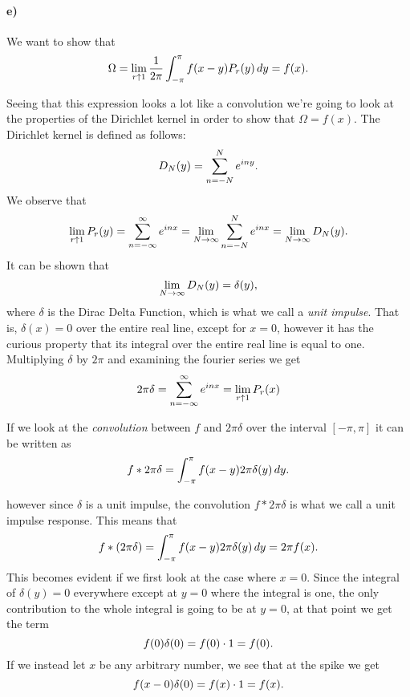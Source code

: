 \documentclass[a4paper]{article}
\begin{document}
\paragraph{e)}
  
We want to show that 
\begin{equation}
  \notag
  \Omega = \lim\limits_{r\uparrow 1} \frac{1}{2\pi}\int_{-\pi}^{\pi}f(x-y)P_r(y) \, dy = f(x).
\end{equation}

Seeing that this expression looks a lot like a convolution we're going to look
at the properties of the Dirichlet kernel in order to show that $\Omega =
f(x)$.  The Dirichlet kernel is defined as follows:
\begin{equation}
  \notag
  D_N(y) = \sum_{n=-N}^{N}e^{iny}.
\end{equation}
We observe that
\begin{equation}
  \notag
  \lim\limits_{r\uparrow 1}P_r(y) = \sum_{n = -\infty}^{\infty} e^{inx} = \lim\limits_{N \rightarrow \infty}\sum_{n=-N}^{N}e^{inx} = \lim\limits_{N \rightarrow \infty} D_N(y).
\end{equation}
It can be shown that
\begin{equation}
  \notag
  \lim\limits_{N \rightarrow \infty} D_N(y) = \delta(y),
\end{equation}
where $\delta$ is the Dirac Delta Function, which is what we call a
\textit{unit impulse}. That is, $\delta(x) = 0$ over the entire real line,
except for $x = 0$, however it has the curious property that its integral over
the entire real line is equal to one. Multiplying $\delta$ by $2\pi$ and examining the
fourier series we get
\begin{equation}
  \notag
  2\pi\delta = \sum_{n=-\infty}^{\infty}e^{inx} = \lim\limits_{r\uparrow 1} P_r(x)
\end{equation}

If we look at the \textit{convolution} between $f$ and $2\pi\delta$ over the
interval $\left[ -\pi, \pi \right]$ it can be written as
\begin{equation}
  \notag
  f * 2\pi\delta = \int_{-\pi}^{\pi}f(x - y)2\pi\delta(y) \, dy.
\end{equation}

however since $\delta$ is a unit impulse, the convolution $f * 2\pi\delta$ is
what we call a unit impulse response.  This means that
\begin{equation}
  \notag
  f * (2\pi\delta) = \int_{-\pi}^{\pi}f(x - y)2\pi\delta(y) \, dy = 2\pi f(x).
\end{equation}
This becomes evident if we first look at the case where $x = 0$.  Since the
integral of $\delta(y) = 0$ everywhere except at $y = 0$ where the integral is
one, the only contribution to the whole integral is going to be at $y = 0$, at
that point we get the term
\begin{equation}
  \notag
  f(0) \delta(0) = f(0) \cdot 1 = f(0).
\end{equation}
If we instead let $x$ be any arbitrary number, we see that at the spike we get
\begin{equation}
  \notag
  f(x - 0) \delta(0) = f(x) \cdot 1 = f(x).
\end{equation}
\end{document}
